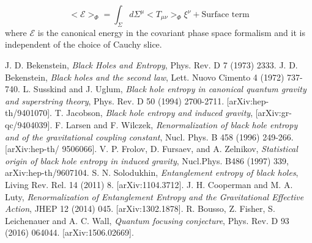 \documentclass[12pt]{article}
\begin{document}
\begin{equation}\label{IIIa5}
\big<\mathcal{E}\big>_{\Phi}=\int_{\Sigma} d\Sigma^{\mu}\big<T_{\mu \nu}\big>_{\Phi}\xi^{\nu} + \text{Surface term}
\end{equation}
where $\mathcal{E}$ is the canonical energy in the covariant phase space formalism and it is independent of the choice of Cauchy slice.
 \newpage
\begin{thebibliography}{100}
 J. D. Bekenstein, \emph{Black Holes and Entropy}, Phys. Rev. D 7 (1973) 2333.
 J. D. Bekenstein, \emph{Black holes and the second law}, Lett. Nuovo Cimento 4 (1972) 737-740.
 L. Susskind and J. Uglum, \emph{Black hole entropy in canonical quantum gravity and superstring
theory}, Phys. Rev. D 50 (1994) 2700-2711. [arXiv:hep-th/9401070].
 T. Jacobson, \emph{Black hole entropy and induced gravity}, [arXiv:gr-qc/9404039].
 F. Larsen and F. Wilczek, \emph{Renormalization of black hole entropy and of the gravitational
coupling constant}, Nucl. Phys. B 458 (1996) 249-266. [arXiv:hep-th/
9506066].
 V. P. Frolov, D. Fursaev, and A. Zelnikov, \emph{Statistical origin of black hole entropy in
induced gravity}, Nucl.Phys. B486 (1997) 339, arXiv:hep-th/9607104.
 S. N. Solodukhin, \emph{Entanglement entropy of black holes}, Living Rev. Rel. 14 (2011) 8.
[arXiv:1104.3712].
 J. H. Cooperman and M. A. Luty, \emph{Renormalization of Entanglement Entropy and the
Gravitational Effective Action}, JHEP 12 (2014) 045. [arXiv:1302.1878].
 R. Bousso, Z. Fisher, S. Leichenauer and A. C. Wall, \emph{Quantum focusing conjecture},
Phys. Rev. D 93 (2016) 064044. [arXiv:1506.02669].


\end{thebibliography}
\end{document}
